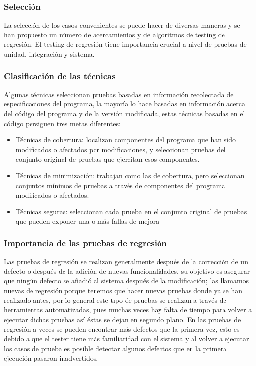 \documentclass[conference]{IEEEtran}
\begin{document}
\subsubsection{Selección}

 La selección de los casos convenientes se puede hacer de diversas maneras y se han propuesto un número de acercamientos y de algoritmos de testing de regresión. El testing de regresión tiene importancia crucial a nivel de pruebas de unidad, integración y sistema.

\subsubsection{Clasificación de las técnicas}
 
Algunas técnicas seleccionan pruebas basadas en información recolectada de especificaciones del programa, la mayoría lo hace basadas en información acerca del código del programa y de la versión modificada, estas técnicas basadas en el código persiguen tres metas diferentes:

\begin{itemize}
\item Técnicas de cobertura: localizan componentes del programa que han sido modificados o afectados por modificaciones, y seleccionan pruebas del conjunto original de pruebas que ejercitan esos componentes.

\item Técnicas de minimización: trabajan como las de cobertura, pero seleccionan conjuntos mínimos de pruebas a través de componentes del programa modificados o afectados. 

\item Técnicas seguras: seleccionan cada prueba en el conjunto original de pruebas que pueden exponer una o más fallas de mejora.
\end{itemize}

\subsubsection{Importancia de las pruebas de regresión}

Las pruebas de regresión se realizan generalmente después de la corrección de un defecto o después de la adición de nuevas funcionalidades, su objetivo es asegurar que ningún defecto se añadió al sistema después de la modificación; las llamamos nuevas de regresión porque tenemos que hacer nuevas pruebas donde ya se han realizado antes, por lo general este tipo de pruebas se realizan a través de herramientas automatizadas, pues muchas veces hay falta de tiempo para volver a ejecutar dichas pruebas así éstas se dejan en segundo plano. En las pruebas de regresión a veces se pueden encontrar más defectos que la primera vez, esto es debido a que el tester tiene más familiaridad con el sistema y al volver a ejecutar los casos de prueba es posible detectar algunos defectos que en la primera ejecución pasaron inadvertidos.
\end{document}
